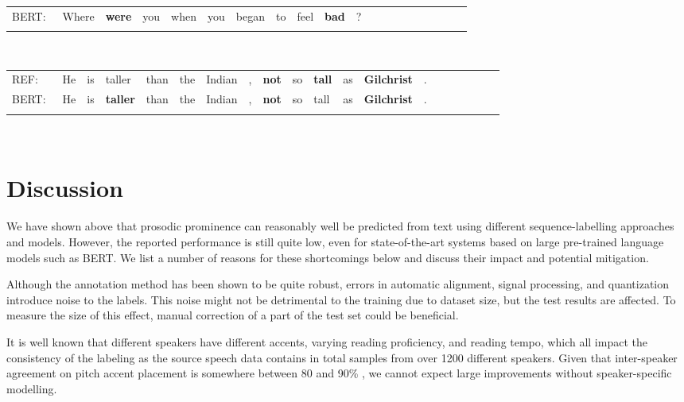 \documentclass[11pt]{article}
\begin{document}
\begin{table*}[h!]
\begin{tabular}{*{20}{l}}
BERT:\quad~ &  Where & \textbf{were} & {\tiny you} & {\tiny when} & {\tiny you} & began & {\tiny to} & feel & \textbf{bad} & ? &  \\
\vspace{-8.5mm}
\end{tabular}
\\
\noindent\begin{tabular}{*{20}{l}}\\
REF: &  {\tiny He} & {\tiny is} & taller & than & {\tiny the} & {\tiny Indian} & , & \textbf{not} & {\tiny so} & \textbf{tall} & {\tiny as} & \textbf{Gilchrist} & . &  \\
BERT:\quad~ &  {\tiny He} & {\tiny is} & \textbf{taller} & {\tiny than} & {\tiny the} & Indian & , & \textbf{not} & so & tall & {\tiny as} & \textbf{Gilchrist} & . &  \\
\vspace{-8.5mm}
\end{tabular}
\\
\endgroup
\caption{Typical 3-way prominence predictions of BERT compared to reference labels. }
\label{predictions}
\end{table*}



\section{Discussion}\label{sec:discussion}
We have shown above that prosodic prominence can reasonably well be predicted from text using different sequence-labelling approaches and models. However, the reported performance is still quite low, even for state-of-the-art systems based on large pre-trained language models such as BERT. We list a number of reasons for these shortcomings below and discuss their impact and potential mitigation. 

Although the annotation method has been shown to be quite robust, errors in automatic alignment, signal processing, and quantization introduce noise to the labels. This noise might not be detrimental to the training due to dataset size, but the test results are affected. To measure the size of this effect, manual correction of a part of the test set could be beneficial.  


It is well known that different speakers have different accents, varying reading proficiency, and reading tempo, which all impact the consistency of the labeling as the source speech data contains in total samples from over 1200 different speakers. Given that inter-speaker agreement on pitch accent placement is somewhere between 80 and 90\% \cite{yuan2005pitch}, we cannot expect large improvements without speaker-specific modelling.
\end{document}
